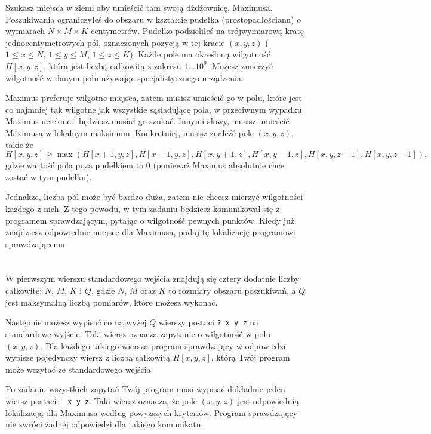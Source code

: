 \ifx\boi\undefined\fi
\def\version{jury-1}

Szukasz miejsca w ziemi aby umieścić tam swoją dżdżownicę, Maximusa. Poszukiwania ograniczyłeś do obszaru w kształcie pudełka (prostopadłościanu)
o wymiarach $N \times M \times K$ centymetrów. Pudełko podzieliłeś na trójwymiarową kratę jednocentymetrowych pól, oznaczonych
pozycją w tej kracie $(x,y,z)$ ($1 \le x \le N$, $1 \le y \le M$, $1 \le z \le K$). Każde pole ma określoną wilgotność $H[x,y,z]$, która jest liczbą całkowitą
z zakresu $1 \dots 10^9$. Możesz zmierzyć wilgotność w danym polu używając specjalistycznego urządzenia.

Maximus preferuje wilgotne miejsca, zatem musisz umieścić go w polu, które jest co najmniej tak wilgotne jak wszystkie sąsiadujące pola, w przeciwnym wypadku Maximus ucieknie i będziesz musiał go szukać.
Innymi słowy, musisz umieścić Maximusa w lokalnym maksimum.
Konkretniej, musisz znaleźć pole $(x,y,z)$, takie że
$$
H[x,y,z] \ge \max(H[x+1,y,z], H[x-1,y,z], H[x,y+1,z], H[x,y-1,z], H[x,y,z+1], H[x,y,z-1]),
$$
gdzie wartość pola poza pudełkiem to $0$ (ponieważ Maximus absolutnie chce zostać w tym pudełku).

Jednakże, liczba pól może być bardzo duża, zatem nie chcesz mierzyć wilgotności każdego z nich. Z tego powodu, w tym zadaniu będziesz komunikował
się z programem sprawdzającym, pytając o wilgotność pewnych punktów. Kiedy już znajdziesz odpowiednie miejsce dla Maximusa, podaj tę lokalizację
programowi sprawdzającemu.

\section*{\interactivity}
W pierwszym wierszu standardowego wejścia znajdują się cztery dodatnie liczby całkowite: $N$, $M$, $K$ i $Q$, gdzie $N$, $M$ oraz $K$ to rozmiary obszaru poszukiwań, a $Q$ jest maksymalną liczbą pomiarów, które możesz wykonać.

Następnie możesz wypisać co najwyżej $Q$ wierszy postaci \texttt{?\ x y z} na standardowe wyjście.
Taki wiersz oznacza zapytanie o wilgotność w polu $(x, y, z)$.
Dla każdego takiego wiersza program sprawdzający w odpowiedzi wypisze pojedynczy wiersz z liczbą całkowitą $H[x,y,z]$, 
którą Twój program może wczytać ze standardowego wejścia.

Po zadaniu wszystkich zapytań Twój program musi wypisać dokładnie jeden wiersz postaci \texttt{!\ x y z}.
Taki wiersz oznacza, że pole $(x, y, z)$ jest odpowiednią lokalizacją dla Maximusa według powyższych kryteriów.
Program sprawdzający nie zwróci żadnej odpowiedzi dla takiego komunikatu.

